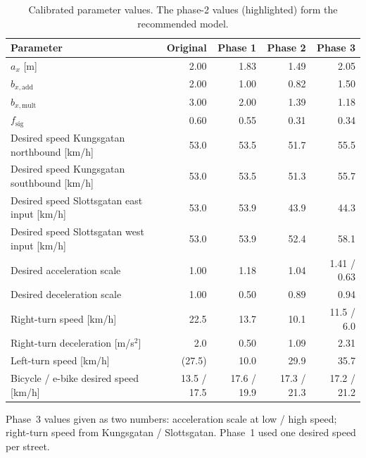 \documentclass[11pt,a4paper]{article}
\begin{document}
\begin{table}[!htb]
\centering
\caption[Calibrated parameter values]{Calibrated parameter values. The phase-2 values (highlighted)
form the recommended model.}
\label{tab:calibrated}
\small
\begin{tabular}{lrr>{\columncolor{lightaccent}}rr}
\toprule
\textbf{Parameter} & \textbf{Original} & \textbf{Phase 1} & \textbf{Phase 2} & \textbf{Phase 3}\\
\midrule
$a_x$ [m]                                  & 2.00 & 1.83 & 1.49 & 2.05\\
$b_{x,\mathrm{add}}$                       & 2.00 & 1.00 & 0.82 & 1.50\\
$b_{x,\mathrm{mult}}$                      & 3.00 & 2.00 & 1.39 & 1.18\\
$f_{\mathrm{sig}}$                         & 0.60 & 0.55 & 0.31 & 0.34\\
Desired speed Kungsgatan northbound [km/h] & 53.0 & 53.5 & 51.7 & 55.5\\
Desired speed Kungsgatan southbound [km/h] & 53.0 & 53.5 & 51.3 & 55.7\\
Desired speed Slottsgatan east input [km/h]& 53.0 & 53.9 & 43.9 & 44.3\\
Desired speed Slottsgatan west input [km/h]& 53.0 & 53.9 & 52.4 & 58.1\\
Desired acceleration scale                 & 1.00 & 1.18 & 1.04 & 1.41 / 0.63\\
Desired deceleration scale                 & 1.00 & 0.50 & 0.89 & 0.94\\
Right-turn speed [km/h]                    & 22.5 & 13.7 & 10.1 & 11.5 / 6.0\\
Right-turn deceleration [m/s$^2$]          & 2.0  & 0.50 & 1.09 & 2.31\\
Left-turn speed [km/h]                     & (27.5) & 10.0 & 29.9 & 35.7\\
Bicycle / e-bike desired speed [km/h]      & 13.5 / 17.5 & 17.6 / 19.9 & 17.3 / 21.3 & 17.2 / 21.2\\
\bottomrule
\end{tabular}

\smallskip
{\footnotesize Phase~3 values given as two numbers: acceleration scale at low / high speed;
right-turn speed from Kungsgatan / Slottsgatan. Phase~1 used one desired speed per street.}
\end{table}
\end{document}
